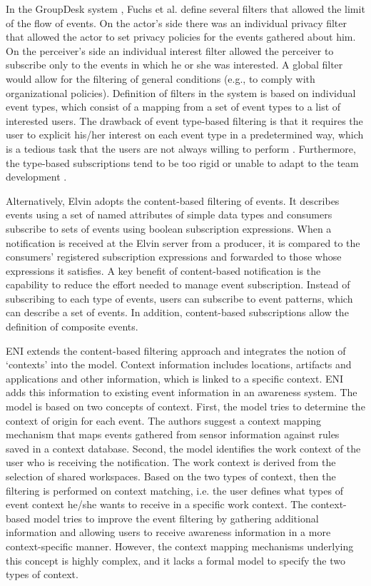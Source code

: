 In the GroupDesk system \cite{Fuchs1995}, Fuchs et al. define several filters that allowed the limit of the flow of events. On the actor’s side there was an individual privacy filter that allowed the actor to set privacy policies for the events gathered about him. On the perceiver’s side an individual interest filter allowed the perceiver to subscribe only to the events in which he or she was interested. A global filter would allow for the filtering of general conditions (e.g., to comply with organizational policies). Definition of filters in the system is based on individual event types, which consist of a mapping from a set of event types to a list of interested users. The drawback of event type-based filtering is that it requires the user to explicit his/her interest on each event type in a predetermined way, which is a tedious task that the users are not always willing to perform \cite{Grudin1994}. Furthermore, the type-based subscriptions tend to be too rigid or unable to adapt to the team development \cite{Alarcon2002}.

Alternatively, Elvin \cite{Fitzpatrick2002} adopts the content-based filtering of events. It describes events using a set of named attributes of simple data types and consumers subscribe to sets of events using boolean subscription expressions. When a notification is received at the Elvin server from a producer, it is compared to the consumers’ registered subscription expressions and forwarded to those whose expressions it satisfies. A key benefit of content-based notification is the capability to reduce the effort needed to manage event subscription. Instead of subscribing to each type of events, users can subscribe to event patterns, which can describe a set of events. In addition, content-based subscriptions allow the definition of composite events.

ENI \cite{Gross2004} extends the content-based filtering approach and integrates the notion of `contexts' into the model. Context information includes locations, artifacts and applications and other information, which is linked to a specific context. ENI adds this information to existing event information in an awareness system. The model is based on two concepts of context. First, the model tries to determine the context of origin for each event. The authors suggest a context mapping mechanism that maps events gathered from sensor information against rules saved in a context database. Second, the model identifies the work context of the user who is receiving the notification. The work context is derived from the selection of shared workspaces. Based on the two types of context, then the filtering is performed on context matching, i.e. the user defines what types of event context he/she wants to receive in a specific work context. The context-based model tries to improve the event filtering by gathering additional information and allowing users to receive awareness information in a more context-specific manner. However, the context mapping mechanisms underlying this concept is highly complex, and it lacks a formal model to specify the two types of context.

